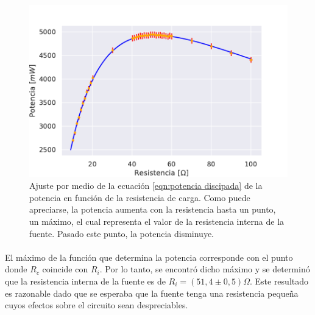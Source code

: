 \begin{figure}[H]
    \centering
    \includegraphics[width = 0.65\linewidth]{figuras/potencia.pdf}    \caption{Ajuste por medio de la ecuación \ref{eqn:potencia discipada} de la potencia en función de la resistencia de carga. Como puede apreciarse, la potencia aumenta con la resistencia hasta un punto, un máximo, el cual representa el valor de la resistencia interna de la fuente. Pasado este punto, la potencia disminuye.}
    \label{fig:fig_fuente}
\end{figure}

\paragraph{}
El máximo de la función que determina la potencia corresponde con el punto donde $R_c$ coincide con $R_i$. Por lo tanto, se encontró dicho máximo y se determinó que la resistencia interna de la fuente es de $R_i=(51,4 \pm 0,5)$$\Omega$. Este resultado es razonable dado que se esperaba que la fuente tenga una resistencia pequeña cuyos efectos sobre el circuito sean despreciables. 